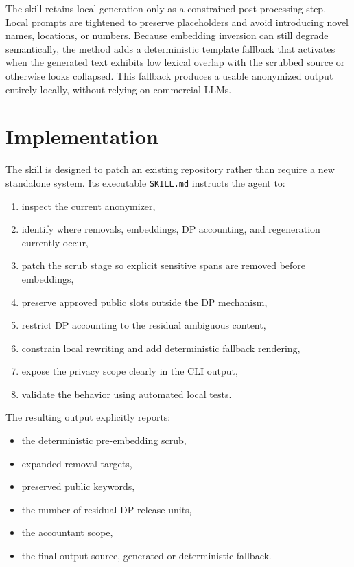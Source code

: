 \documentclass[11pt]{article}
\begin{document}
The skill retains local generation only as a constrained post-processing step. Local prompts are tightened to preserve placeholders and avoid introducing novel names, locations, or numbers. Because embedding inversion can still degrade semantically, the method adds a deterministic template fallback that activates when the generated text exhibits low lexical overlap with the scrubbed source or otherwise looks collapsed. This fallback produces a usable anonymized output entirely locally, without relying on commercial LLMs.

\section{Implementation}

The skill is designed to patch an existing repository rather than require a new standalone system. Its executable \texttt{SKILL.md} instructs the agent to:
\begin{enumerate}[leftmargin=1.5em]
    \item inspect the current anonymizer,
    \item identify where removals, embeddings, DP accounting, and regeneration currently occur,
    \item patch the scrub stage so explicit sensitive spans are removed before embeddings,
    \item preserve approved public slots outside the DP mechanism,
    \item restrict DP accounting to the residual ambiguous content,
    \item constrain local rewriting and add deterministic fallback rendering,
    \item expose the privacy scope clearly in the CLI output,
    \item validate the behavior using automated local tests.
\end{enumerate}

The resulting output explicitly reports:
\begin{itemize}[leftmargin=1.5em]
    \item the deterministic pre-embedding scrub,
    \item expanded removal targets,
    \item preserved public keywords,
    \item the number of residual DP release units,
    \item the accountant scope,
    \item the final output source, generated or deterministic fallback.
\end{itemize}
\end{document}
